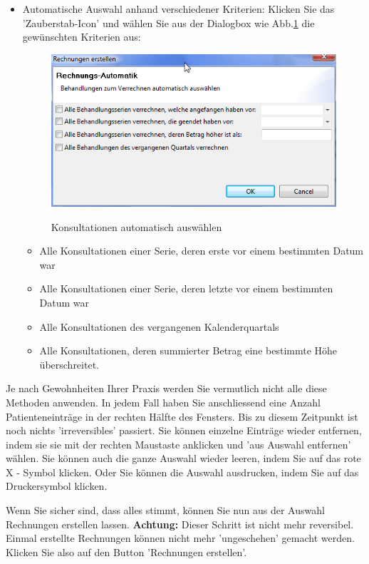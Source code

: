 \documentclass[a4paper]{scrartcl}
\begin{document}
\begin{itemize}
\item Automatische Auswahl anhand verschiedener Kriterien: Klicken Sie das 'Zauberstab-Icon' und wählen Sie aus der Dialogbox wie Abb.\ref{fig:abr9} die gewünschten Kriterien aus:
\begin{figure}
  \includegraphics{abr9}\\
  \caption{Konsultationen automatisch auswählen}\label{fig:abr9}
\end{figure}
\begin{itemize}
    \item Alle Konsultationen einer Serie, deren erste vor einem bestimmten Datum war
    \item Alle Konsultationen einer Serie, deren letzte vor einem bestimmten Datum war
    \item Alle Konsultationen des vergangenen Kalenderquartals
    \item Alle Konsultationen, deren summierter Betrag eine bestimmte Höhe überschreitet.
    \end{itemize}
\end{itemize}

Je nach Gewohnheiten Ihrer Praxis werden Sie vermutlich nicht alle diese Methoden anwenden. In jedem Fall haben Sie anschliessend eine Anzahl Patienteneinträge in der rechten Hälfte des Fensters. Bis zu diesem Zeitpunkt ist noch nichts 'irreversibles' passiert. Sie können einzelne Einträge wieder entfernen, indem sie sie mit der rechten Maustaste anklicken und 'aus Auswahl entfernen' wählen. Sie können auch die ganze Auswahl wieder leeren, indem Sie auf das rote X - Symbol klicken. Oder Sie können die Auswahl ausdrucken, indem Sie auf das Druckersymbol klicken.

\medskip

Wenn Sie sicher sind, dass alles stimmt, können Sie nun aus der Auswahl Rechnungen erstellen lassen. \textbf{Achtung:} Dieser Schritt ist nicht mehr reversibel. Einmal erstellte Rechnungen können nicht mehr 'ungeschehen' gemacht werden. Klicken Sie also auf den Button 'Rechnungen erstellen'. 
\end{document}
